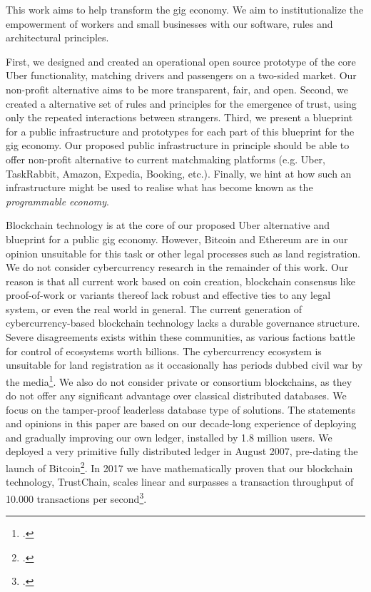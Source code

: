 \documentclass[USenglish]{article}
\begin{document}
This work aims to help transform the gig economy.
We aim to institutionalize the empowerment of workers and small businesses with our software, rules and architectural principles.

First, we designed and created an operational open source prototype of the core Uber functionality, matching drivers and passengers on a two-sided market.
Our non-profit alternative aims to be more transparent, fair, and open.
Second, we created a alternative set of rules and principles for the emergence of trust, using only the repeated interactions between strangers.
Third, we present a blueprint for a public infrastructure and prototypes for each part of this blueprint for the gig economy.
Our proposed public infrastructure in principle should be able to offer non-profit alternative to current matchmaking platforms (e.g. Uber, TaskRabbit, Amazon, Expedia, Booking, etc.).
Finally, we hint at how such an infrastructure might be used to realise what has become known as the \emph{programmable economy}.

Blockchain technology is at the core of our proposed Uber alternative and blueprint for a public gig economy.
However, Bitcoin and Ethereum are in our opinion unsuitable for this task or other legal processes such as land registration.
We do not consider cybercurrency research in the remainder of this work.
Our reason is that all current work based on coin creation, blockchain consensus like proof-of-work or variants thereof lack robust and effective ties to any legal system, or even the real world in general.
The current generation of cybercurrency-based blockchain technology lacks a durable governance structure.
Severe disagreements exists within these communities, as various factions battle for control of ecosystems worth billions.
The cybercurrency ecosystem is unsuitable for land registration as it occasionally has periods dubbed civil war by the media\footcite{bloombergbitcoinsplinter}.
We also do not consider private or consortium blockchains, as they do not offer any significant advantage over classical distributed databases.
We focus on the tamper-proof leaderless database type of solutions.
The statements and opinions in this paper are based on our decade-long experience of deploying and gradually improving our own ledger, installed by 1.8 million users.
We deployed a very primitive fully distributed ledger in August 2007, pre-dating the launch of Bitcoin\footcite{bbcnewstribler}.
In 2017 we have mathematically proven that our blockchain technology, TrustChain, scales linear and surpasses a transaction throughput of 10.000 transactions per second\footcite{githubissueconsensus}.
\end{document}
